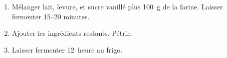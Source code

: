 

\begin{ingredients}
\end{ingredients}



\begin{recipe}
  \begin{enumerate}

  \item Mélanger lait, levure, et sucre vanillé plus 100~g de la
    farine.  Laisser fermenter 15--20 minutes.

  \item Ajouter les ingrédients restants.  Pétrir.

  \item Laisser fermenter 12~heure au frigo.

  \end{enumerate}
\end{recipe}


\begin{ingredients}
\end{ingredients}


\begin{ingredients}
\end{ingredients}


